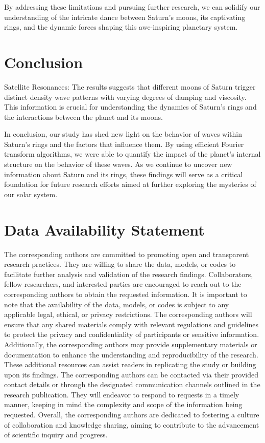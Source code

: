 \documentclass{article}
\begin{document}
By addressing these limitations and pursuing further research, we can solidify our understanding of the intricate dance between Saturn's moons, its captivating rings, and the dynamic forces shaping this awe-inspiring planetary system.







\section{Conclusion}

Satellite Resonances: The results suggests that different moons of Saturn trigger distinct density wave patterns with varying degrees of damping and viscosity. This information is crucial for understanding the dynamics of Saturn's rings and the interactions between the planet and its moons.

In conclusion, our study has shed new light on the behavior of waves within Saturn's rings and the factors that influence them. By using efficient Fourier transform algorithms, we were able to quantify the impact of the planet's internal structure on the behavior of these waves. As we continue to uncover new information about Saturn and its rings, these findings will serve as a critical foundation for future research efforts aimed at further exploring the mysteries of our solar system.

\section{Data Availability Statement}
The corresponding authors are committed to promoting open and transparent research practices. They are willing to share the data, models, or codes to facilitate further analysis and validation of the research findings. Collaborators, fellow researchers, and interested parties are encouraged to reach out to the corresponding authors to obtain the requested information. It is important to note that the availability of the data, models, or codes is subject to any applicable legal, ethical, or privacy restrictions. The corresponding authors will ensure that any shared materials comply with relevant regulations and guidelines to protect the privacy and confidentiality of participants or sensitive information. Additionally, the corresponding authors may provide supplementary materials or documentation to enhance the understanding and reproducibility of the research. These additional resources can assist readers in replicating the study or building upon its findings. The corresponding authors can be contacted via their provided contact details or through the designated communication channels outlined in the research publication. They will endeavor to respond to requests in a timely manner, keeping in mind the complexity and scope of the information being requested. Overall, the corresponding authors are dedicated to fostering a culture of collaboration and knowledge sharing, aiming to contribute to the advancement of scientific inquiry and progress.
\end{document}
